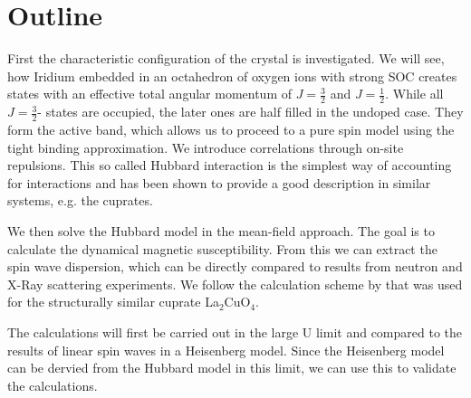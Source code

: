 \documentclass[a4paper,12pt]{report}
\begin{document}





\section{Outline}

First the characteristic configuration of the crystal is  investigated.
We will see, how Iridium embedded in an octahedron of oxygen ions  with strong  SOC
creates states with an effective total angular momentum of $J=\frac32$ and $J=\frac12$.
While all $J=\frac32$- states are occupied, the later ones are half filled in the undoped case.
They form the active band, which allows us to proceed to a pure spin model using the tight binding approximation.
We introduce  correlations through on-site repulsions. 
This so called Hubbard interaction is the simplest way of accounting for interactions 
and has been shown to provide a good description in similar systems, e.g. the cuprates.

We then solve the Hubbard model in the mean-field approach.
The goal is to calculate the dynamical magnetic susceptibility.
From this we can extract the spin wave dispersion, which 
can be directly compared to results from neutron and X-Ray scattering experiments.
We follow the calculation scheme by  \citet{PhysRevB.65.132404} that was used for the structurally similar cuprate La$_2$CuO$_4$.

The calculations will first be carried out in the large U limit and compared to the results of linear spin waves in a Heisenberg model.
Since the Heisenberg model can be dervied from the Hubbard model in this limit, we can use this to validate the calculations.
\end{document}
